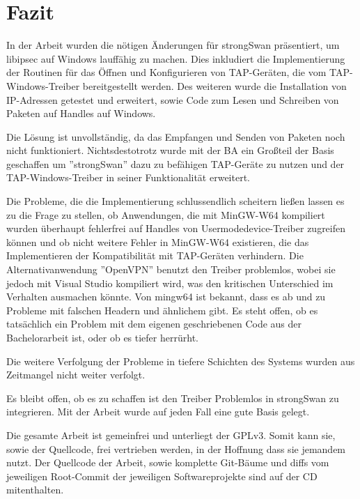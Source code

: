 



\section{Fazit}

In der Arbeit wurden die nötigen Änderungen für strongSwan präsentiert, um
libipsec auf Windows lauffähig zu machen. Dies inkludiert die Implementierung
der Routinen für das Öffnen und Konfigurieren von TAP-Geräten, die vom TAP-Windows-Treiber
bereitgestellt werden. Des weiteren wurde die Installation von IP-Adressen getestet
und erweitert, sowie Code zum Lesen und Schreiben von Paketen auf Handles auf Windows.

Die Lösung ist unvollständig, da das Empfangen und Senden von Paketen noch nicht funktioniert.
Nichtsdestotrotz wurde mit der \ac{BA} ein Großteil der Basis geschaffen um ''strongSwan''
dazu zu befähigen TAP-Geräte zu nutzen und der TAP-Windows-Treiber in seiner Funktionalität
erweitert.

Die Probleme, die die Implementierung schlussendlich scheitern ließen lassen es zu
die Frage zu stellen, ob Anwendungen, die mit MinGW-W64 kompiliert wurden überhaupt
fehlerfrei auf Handles von Usermodedevice-Treiber zugreifen können und ob
nicht weitere Fehler in MinGW-W64 existieren, die das Implementieren der Kompatibilität
mit TAP-Geräten verhindern. Die Alternativanwendung ''OpenVPN'' benutzt den
Treiber problemlos, wobei sie jedoch mit Visual Studio kompiliert wird,
was den kritischen Unterschied im Verhalten ausmachen könnte.
Von mingw64 ist bekannt, dass es ab und zu Probleme mit falschen Headern und ähnlichem
gibt. Es steht offen, ob es tatsächlich ein Problem mit dem eigenen geschriebenen Code
aus der Bachelorarbeit ist, oder ob es tiefer herrürht.

Die weitere Verfolgung der Probleme in tiefere Schichten des Systems wurden aus
Zeitmangel nicht weiter verfolgt.

Es bleibt offen, ob es zu schaffen ist den Treiber Problemlos in strongSwan zu integrieren.
Mit der Arbeit wurde auf jeden Fall eine gute Basis gelegt.

Die gesamte Arbeit ist gemeinfrei und unterliegt der GPLv3. Somit kann sie,
sowie der Quellcode, frei vertrieben werden, in der Hoffnung dass sie jemandem nutzt.
Der Quellcode der Arbeit, sowie komplette Git-Bäume und diffs vom jeweiligen Root-Commit
der jeweiligen Softwareprojekte sind auf der CD mitenthalten.
